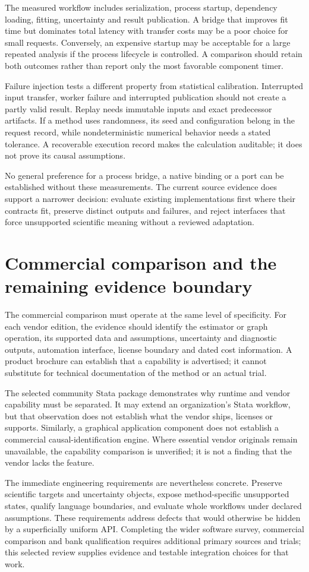 The measured workflow includes serialization, process startup, dependency
loading, fitting, uncertainty and result publication. A bridge that improves
fit time but dominates total latency with transfer costs may be a poor choice
for small requests. Conversely, an expensive startup may be acceptable for a
large repeated analysis if the process lifecycle is controlled. A comparison
should retain both outcomes rather than report only the most favorable
component timer.

Failure injection tests a different property from statistical calibration.
Interrupted input transfer, worker failure and interrupted publication should
not create a partly valid result. Replay needs immutable inputs and exact
predecessor artifacts. If a method uses randomness, its seed and configuration
belong in the request record, while nondeterministic numerical behavior needs
a stated tolerance. A recoverable execution record makes the calculation
auditable; it does not prove its causal assumptions.

No general preference for a process bridge, a native binding or a port can
be established without these measurements. The current source evidence does
support a narrower decision: evaluate existing implementations first where
their contracts fit, preserve distinct outputs and failures, and reject
interfaces that force unsupported scientific meaning without a reviewed
adaptation.

\section{Commercial comparison and the remaining evidence boundary}

The commercial comparison must operate at the same level of specificity.
For each vendor edition, the evidence should identify the estimator or graph
operation, its supported data and assumptions, uncertainty and diagnostic
outputs, automation interface, license boundary and dated cost information.
A product brochure can establish that a capability is advertised; it cannot
substitute for technical documentation of the method or an actual trial.

The selected community Stata package demonstrates why runtime and vendor
capability must be separated. It may extend an organization's Stata workflow,
but that observation does not establish what the vendor ships, licenses or
supports. Similarly, a graphical application component does not establish a
commercial causal-identification engine. Where essential vendor originals
remain unavailable, the capability comparison is unverified; it is not a
finding that the vendor lacks the feature.

The immediate engineering requirements are nevertheless concrete. Preserve
scientific targets and uncertainty objects, expose method-specific unsupported
states, qualify language boundaries, and evaluate whole workflows under
declared assumptions. These requirements address defects that would otherwise
be hidden by a superficially uniform API. Completing the wider software
survey, commercial comparison and bank qualification requires additional
primary sources and trials; this selected review supplies evidence and
testable integration choices for that work.
